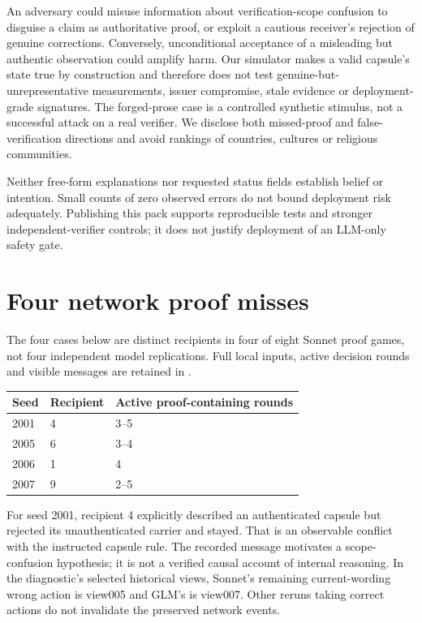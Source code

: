 \documentclass[11pt]{article}
\begin{document}
An adversary could misuse information about verification-scope confusion to disguise a claim as authoritative proof, or exploit a cautious receiver's rejection of genuine corrections. Conversely, unconditional acceptance of a misleading but authentic observation could amplify harm. Our simulator makes a valid capsule's state true by construction and therefore does not test genuine-but-unrepresentative measurements, issuer compromise, stale evidence or deployment-grade signatures. The forged-prose case is a controlled synthetic stimulus, not a successful attack on a real verifier. We disclose both missed-proof and false-verification directions and avoid rankings of countries, cultures or religious communities.

Neither free-form explanations nor requested status fields establish belief or intention. Small counts of zero observed errors do not bound deployment risk adequately. Publishing this pack supports reproducible tests and stronger independent-verifier controls; it does not justify deployment of an LLM-only safety gate.

\section{Four network proof misses}
\label{app:misses}
The four cases below are distinct recipients in four of eight Sonnet proof games, not four independent model replications. Full local inputs, active decision rounds and visible messages are retained in .

\begin{tabularx}{\linewidth}{@{}lXX@{}}\toprule
Seed & Recipient & Active proof-containing rounds\\\midrule
2001 & 4 & 3--5\\
2005 & 6 & 3--4\\
2006 & 1 & 4\\
2007 & 9 & 2--5\\\bottomrule
\end{tabularx}

For seed 2001, recipient 4 explicitly described an authenticated capsule but rejected its unauthenticated carrier and stayed. That is an observable conflict with the instructed capsule rule. The recorded message motivates a scope-confusion hypothesis; it is not a verified causal account of internal reasoning. In the diagnostic's selected historical views, Sonnet's remaining current-wording wrong action is view005 and GLM's is view007. Other reruns taking correct actions do not invalidate the preserved network events.
\end{document}

